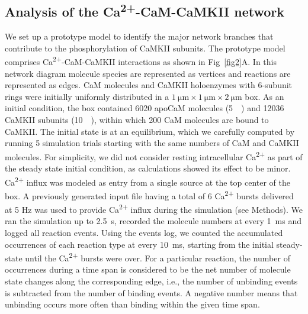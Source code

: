 \documentclass[10pt,letterpaper]{article}
\begin{document}
\subsection*{Analysis of the Ca\textsuperscript{2+}-CaM-CaMKII network}

We set up a prototype model to identify the major network branches that contribute to the phosphorylation of CaMKII subunits. The prototype model comprises Ca\textsuperscript{2+}-CaM-CaMKII interactions as shown in Fig~\ref{fig2}A. In this network diagram molecule species are represented as vertices and reactions are represented as edges. CaM molecules and CaMKII holoenzymes with 6-subunit rings were initially uniformly distributed in a $\SI{1}{\um}\times\SI{1}{\um}\times\SI{2}{\um}$ box. As an initial condition, the box contained 6020 apoCaM molecules (\SI{5}{\micro\Molar}) and 12036 CaMKII subunits (\SI{10}{\micro\Molar}), within which 200 CaM molecules are bound to CaMKII. The initial state is at an equilibrium, which we carefully computed by running 5 simulation trials starting with the same numbers of CaM and CaMKII molecules. For simplicity, we did not consider resting intracellular Ca\textsuperscript{2+} as part of the steady state initial condition, as calculations showed its effect to be minor. Ca\textsuperscript{2+} influx was modeled as entry from a single source at the top center of the box. A previously generated input file having a total of 6 Ca\textsuperscript{2+} bursts delivered at 5 Hz was used to provide Ca\textsuperscript{2+} influx during the simulation (see Methods). We ran the simulation up to \SI{2.5}{\s}, recorded the molecule numbers at every \SI{1}{\ms} and logged all reaction events. Using the events log, we counted the accumulated occurrences of each reaction type at every \SI{10}{\ms}, starting from the initial steady-state until the Ca\textsuperscript{2+} bursts were over. For a particular reaction, the number of occurrences during a time span is considered to be the net number of molecule state changes along the corresponding edge, i.e., the number of unbinding events is subtracted from the number of binding events. A negative number means that unbinding occurs more often than binding within the given time span. 
\end{document}
